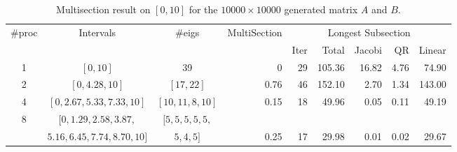 \begin{table*}
\begin{center}
\begin{tabular}{|c | c | c | r | r | r | r | r | r |}
\hline
$\#$proc & Intervals & $\#$eigs & MultiSection & \multicolumn{5}{|c|}{Longest Subsection} \\
  & & &  & Iter & Total & Jacobi & QR & Linear \\
\hline
1 & $[0, 10]$ & 39 & 0 & 29 & 105.36 & 16.82 & 4.76 & 74.90 \\
2 & $[0, 4.28, 10]$ & $[17, 22]$ & 0.76 &  46 & 152.10 & 2.70 & 1.34 & 143.00\\
4 & $[0, 2.67, 5.33, 7.33, 10]$ & $[10, 11, 8, 10]$ & 0.15 & 18 & 49.96 & 0.05 & 0.11 & 49.19 \\
8 &$[0, 1.29, 2.58, 3.87, $ & $[5, 5, 5, 5, 5,$ & &  & & & & \\
& $5.16, 6.45, 7.74, 8.70, 10]$& $5, 4, 5]$& 0.25 & 17 & 29.98 & 0.01 & 0.02 & 29.67\\
\hline
\end{tabular}
\caption{Multisection result on $[0, 10]$ for the $10000 \times 10000$ generated matrix $A$ and $B$.}
\label{tab:result-multisection}
\end{center}
\end{table*}

